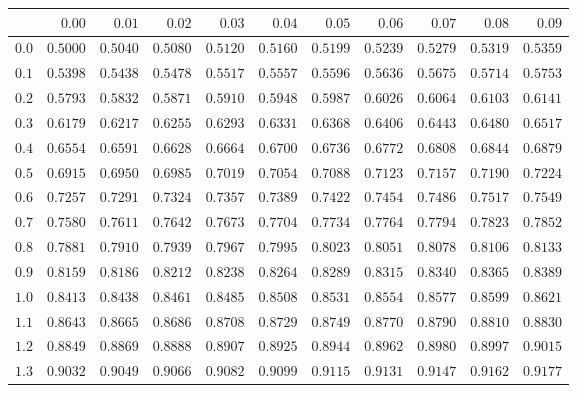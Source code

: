 \documentclass[
  11pt,
  a4paper,
  krantz2]{krantz}
\begin{document}
\begin{table}
\centering\begingroup\fontsize{9}{11}\selectfont

\begin{tabular}{lrrrrrrrrrr}
\toprule
  & $ 0.00 $ & $ 0.01 $ & $ 0.02 $ & $ 0.03 $ & $ 0.04 $ & $ 0.05 $ & $ 0.06 $ & $ 0.07 $ & $ 0.08 $ & $ 0.09 $\\
\midrule
$0.0$ & $0.5000$ & $0.5040$ & $0.5080$ & $0.5120$ & $0.5160$ & $0.5199$ & $0.5239$ & $0.5279$ & $0.5319$ & $0.5359$\\
$ 0.1 $ & $0.5398$ & $0.5438$ & $0.5478$ & $0.5517$ & $0.5557$ & $0.5596$ & $0.5636$ & $0.5675$ & $0.5714$ & $0.5753$\\
$ 0.2 $ & $0.5793$ & $0.5832$ & $0.5871$ & $0.5910$ & $0.5948$ & $0.5987$ & $0.6026$ & $0.6064$ & $0.6103$ & $0.6141$\\
$ 0.3 $ & $0.6179$ & $0.6217$ & $0.6255$ & $0.6293$ & $0.6331$ & $0.6368$ & $0.6406$ & $0.6443$ & $0.6480$ & $0.6517$\\
$ 0.4 $ & $0.6554$ & $0.6591$ & $0.6628$ & $0.6664$ & $0.6700$ & $0.6736$ & $0.6772$ & $0.6808$ & $0.6844$ & $0.6879$\\
\vspace{3pt}
$ 0.5 $ & $0.6915$ & $0.6950$ & $0.6985$ & $0.7019$ & $0.7054$ & $0.7088$ & $0.7123$ & $0.7157$ & $0.7190$ & $0.7224$\\
$ 0.6 $ & $0.7257$ & $0.7291$ & $0.7324$ & $0.7357$ & $0.7389$ & $0.7422$ & $0.7454$ & $0.7486$ & $0.7517$ & $0.7549$\\
$ 0.7 $ & $0.7580$ & $0.7611$ & $0.7642$ & $0.7673$ & $0.7704$ & $0.7734$ & $0.7764$ & $0.7794$ & $0.7823$ & $0.7852$\\
$ 0.8 $ & $0.7881$ & $0.7910$ & $0.7939$ & $0.7967$ & $0.7995$ & $0.8023$ & $0.8051$ & $0.8078$ & $0.8106$ & $0.8133$\\
$ 0.9 $ & $0.8159$ & $0.8186$ & $0.8212$ & $0.8238$ & $0.8264$ & $0.8289$ & $0.8315$ & $0.8340$ & $0.8365$ & $0.8389$\\
\vspace{3pt}
$ 1.0 $ & $0.8413$ & $0.8438$ & $0.8461$ & $0.8485$ & $0.8508$ & $0.8531$ & $0.8554$ & $0.8577$ & $0.8599$ & $0.8621$\\
$ 1.1 $ & $0.8643$ & $0.8665$ & $0.8686$ & $0.8708$ & $0.8729$ & $0.8749$ & $0.8770$ & $0.8790$ & $0.8810$ & $0.8830$\\
$ 1.2 $ & $0.8849$ & $0.8869$ & $0.8888$ & $0.8907$ & $0.8925$ & $0.8944$ & $0.8962$ & $0.8980$ & $0.8997$ & $0.9015$\\
$ 1.3 $ & $0.9032$ & $0.9049$ & $0.9066$ & $0.9082$ & $0.9099$ & $0.9115$ & $0.9131$ & $0.9147$ & $0.9162$ & $0.9177$\\

\end{tabular}
\end{table}
\end{document}

